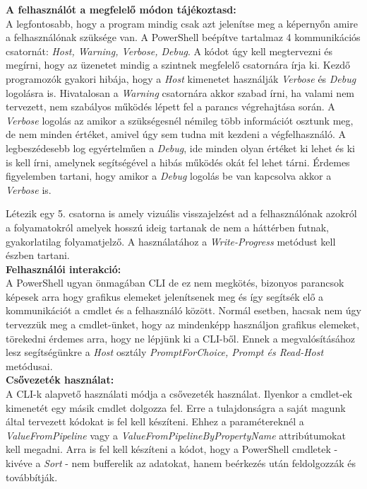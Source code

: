 \documentclass[12pt,oneside,justify,table]{book}
\begin{document}
\noindent \textbf{A felhasználót a megfelelő módon tájékoztasd:} \\
A legfontosabb, hogy a program mindig csak azt jelenítse meg a képernyőn amire a felhasználónak szüksége van. A PowerShell beépítve tartalmaz 4 kommunikációs csatornát: \textit{Host, Warning, Verbose, Debug}. A kódot úgy kell megtervezni és megírni, hogy az üzenetet mindig a szintnek megfelelő csatornára írja ki. Kezdő programozók gyakori hibája, hogy a \textit{Host} kimenetet használják  \textit{Verbose} és \textit{Debug} logolásra is.  Hivatalosan a \textit{Warning} csatornára akkor szabad írni, ha valami nem tervezett, nem szabályos működés lépett fel a parancs végrehajtása során. A \textit{Verbose} logolás az amikor a szükségesnél némileg több információt osztunk meg, de nem minden értéket, amivel úgy sem tudna mit kezdeni a végfelhasználó. A legbeszédesebb log egyértelműen a \textit{Debug}, ide minden olyan értéket ki lehet és ki is kell írni, amelynek segítségével a hibás működés okát fel lehet tárni. Érdemes figyelemben tartani, hogy amikor a \textit{Debug} logolás be van kapcsolva akkor a \textit{Verbose} is. 

Létezik egy 5. csatorna is amely vizuális visszajelzést ad a felhasználónak azokról a folyamatokról amelyek hosszú ideig tartanak de nem a háttérben futnak, gyakorlatilag folyamatjelző. A használatához a \textit{Write-Progress} metódust kell észben tartani.\\

\noindent \textbf{Felhasználói interakció:}\\
A PowerShell ugyan önmagában CLI de ez nem megkötés, bizonyos parancsok képesek arra hogy grafikus elemeket jelenítsenek meg és így segítsék elő a kommunikációt a cmdlet és a felhasználó között. Normál esetben, hacsak nem úgy tervezzük meg a cmdlet-ünket, hogy az mindenképp használjon grafikus elemeket, törekedni érdemes arra, hogy ne lépjünk ki a CLI-ből. Ennek a megvalósításához lesz segítségünkre a \textit{Host} osztály \textit{PromptForChoice, Prompt és Read-Host} metódusai.\\

\noindent \textbf{Csővezeték használat:} \\
A CLI-k alapvető használati módja a csővezeték használat. Ilyenkor a cmdlet-ek kimenetét egy másik cmdlet dolgozza fel. Erre a tulajdonságra a saját magunk által tervezett kódokat is fel kell készíteni. Ehhez a paramétereknél a \textit{ValueFromPipeline} vagy a \textit{ValueFromPipelineByPropertyName} attribútumokat kell megadni. Arra is fel kell készíteni a kódot, hogy a PowerShell cmdletek - kivéve a \textit{Sort} - nem bufferelik az adatokat, hanem beérkezés után feldolgozzák és továbbítják. \\
\end{document}

